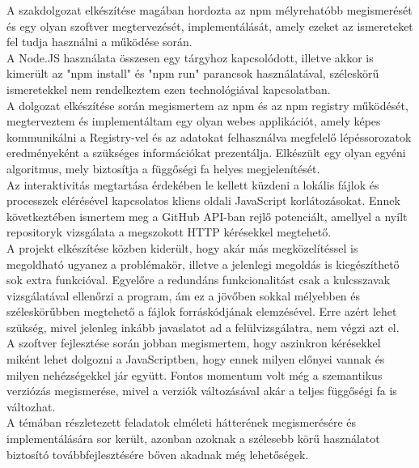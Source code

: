 
A szakdolgozat elkészítése magában hordozta az npm mélyrehatóbb megismerését és egy olyan szoftver megtervezését, implementálását, amely ezeket az ismereteket fel tudja használni a működése során.\\

A Node.JS használata összesen egy tárgyhoz kapcsolódott, illetve akkor is kimerült az "npm install" és "npm run" parancsok használatával, széleskörű ismeretekkel nem rendelkeztem ezen technológiával kapcsolatban.\\

A dolgozat elkészítése során megismertem az npm és az npm registry működését, megterveztem és implementáltam egy olyan webes applikációt, amely képes kommunikálni a Registry-vel és az adatokat felhasználva megfelelő lépéssorozatok eredményeként a szükséges információkat prezentálja. Elkészült egy olyan egyéni algoritmus, mely biztosítja a függőségi fa helyes megjelenítését.\\

Az interaktivitás megtartása érdekében le kellett küzdeni a lokális fájlok és processzek elérésével kapcsolatos kliens oldali JavaScript korlátozásokat. Ennek következtében ismertem meg a GitHub API-ban rejlő potenciált, amellyel a nyílt repositoryk vizsgálata a megszokott HTTP kérésekkel megtehető.\\

A projekt elkészítése közben kiderült, hogy akár más megközelítéssel is megoldható ugyanez a problémakör, illetve a jelenlegi megoldás is kiegészíthető sok extra funkcióval. Egyelőre a redundáns funkcionalitást csak a kulcsszavak vizsgálatával ellenőrzi a program, ám ez a jövőben sokkal mélyebben és széleskörűbben megtehető a fájlok forráskódjának elemzésével. Erre azért lehet szükség, mivel jelenleg inkább javaslatot ad a felülvizsgálatra, nem végzi azt el.\\

A szoftver fejlesztése során jobban megismertem, hogy aszinkron kérésekkel miként lehet dolgozni a JavaScriptben, hogy ennek milyen előnyei vannak és milyen nehézségekkel jár együtt. Fontos momentum volt még a szemantikus verziózás megismerése, mivel a verziók változásával akár a teljes függőségi fa is változhat.\\

A témában részletezett feladatok elméleti hátterének megismerésére és implementálására sor került, azonban azoknak a szélesebb körű használatot biztosító továbbfejlesztésére bőven akadnak még lehetőségek.

 



